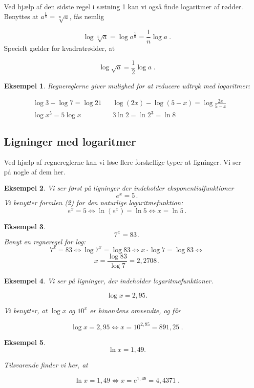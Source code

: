 \documentclass[12pt,oneside,a4paper]{article}
\theoremstyle{plain}
\newtheorem*{eks}{Eksempel}
\begin{document}
Ved hjælp af den sidste regel i sætning 1 kan vi også finde logaritmer af
rødder. Benyttes at $a^{\frac{1}{n}} = \sqrt[n]{a}$, fås nemlig

\[
\log \sqrt[n]{a} = \log a^{\frac{1}{n}} = \frac{1}{n} \log a \; .
\]
Specielt gælder for kvadratrødder, at

\[
\log \sqrt{a} = \frac{1}{2} \log a \; .
\]

\begin{eks}

Regnereglerne giver mulighed for at reducere udtryk med logaritmer:

\[
\begin{aligned}
    &\log 3 + \log 7 = \log 21 && \log (2x) - \log (5 - x) = \log \frac{2x}{5 - x} \\
    &\log x^5 = 5 \log x && 3 \ln 2 = \ln 2^3 = \ln 8
\end{aligned}
\]
\end{eks}

\subsection*{Ligninger med logaritmer}
Ved hjælp af regnereglerne kan vi løse flere forskellige typer at ligninger.
Vi ser på nogle af dem her.

\begin{eks}
Vi ser først på ligninger der indeholder eksponentialfunktioner
\[
e^x = 5\,.
\]
Vi benytter formlen (2) for den naturlige logaritmefunktion:
\[
e^x = 5 \iff \ln (e^x) = \ln 5 \iff x = \ln 5\,.
\]
\end{eks}

\begin{eks}
\[
    7^x = 83\,.
\]
Benyt en regneregel for log:
\[
7^x = 83 \iff \log 7^x = \log 83 \iff x \cdot \log 7 = \log 83 \iff 
\]
\[
    x = \frac{\log 83}{\log 7} = 2,2708\,.
\]
\end{eks}

\begin{eks}

Vi ser på ligninger, der indeholder logaritmefunktioner. 

\[
\log x = 2,95.
\]

Vi benytter, at $\log x$ og $10^x$ er hinandens omvendte, og får

\[
\log x = 2,95 \iff x = 10^{2,95} = 891,25 \; .
\]
\end{eks}

\begin{eks}
\[
\ln x = 1,49.
\]

Tilsvarende finder vi her, at

\[
\ln x = 1,49 \iff x = e^{1,49} = 4,4371 \; .
\]
\end{eks}
\end{document}
